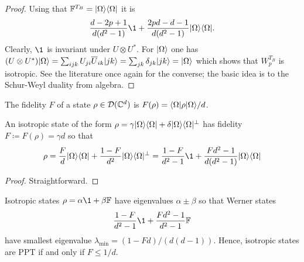 \begin{proof}
    Using that $\mathbb F^{T_B} = \lvert\Omega\rangle\langle\Omega\rvert$ it is 
    \begin{align*}
    \frac{d-2p+1}{d(d^2-1)}\1 + \frac{2pd-d-1}{d(d^2-1)}\pr \Omega.
    \end{align*}
    Clearly, $\1$ is invariant under $U\otimes U^*$. For $\lvert\Omega\rangle$ one has $(U\otimes U^*)\lvert\Omega\rangle = \sum_{ijk}U_{ji}\overline U_{ik} \lvert jk\rangle = \sum_{jk}\delta_{jk}\lvert jk\rangle=\lvert\Omega\rangle$ which shows that $W_p^{T_B}$ is isotropic. See the literature once again for the converse; the basic idea is to the Schur-Weyl duality from algebra.
\end{proof}
\begin{definition}
    The fidelity $F$ of a state $\rho \in \mathcal D(\mathbb{C}^d)$ is $
        F(\rho) = \langle\Omega\rvert \rho \lvert\Omega\rangle/d$.
\end{definition}
\begin{lemma}\label{prop:fidelity_isotropic}
    An isotropic state of the form $\rho = \gamma \lvert\Omega\rangle\langle\Omega\rvert + \delta \lvert\Omega\rangle\langle\Omega\rvert ^\perp$ has fidelity $F\coloneqq F(\rho) = \gamma d $ so that \begin{align*}
        \rho = \frac{F}{d}\pr \Omega + \frac{1-F}{d^2}\pr \Omega^\perp =\frac{1-F}{d^2-1}\1+ \frac{Fd^2-1}{d(d^2-1)}\pr \Omega 
    \end{align*}
\end{lemma}
\begin{proof}
    Straightforward.
\end{proof}
\begin{lemma}
    Isotropic states $\rho = \alpha \1+\beta \mathbb F$ have eigenvalues $\alpha \pm \beta$ so that Werner states 
    \begin{align*}
        \frac{1-F}{d^2-1}\1+\frac{Fd^2-1}{d^2-1}\mathbb F
    \end{align*}
    have smallest eigenvalue $\lambda_\text{min} = (1-Fd)/(d(d-1))$. Hence, isotropic states are PPT if and only if $F\leq 1/d$.
\end{lemma}

